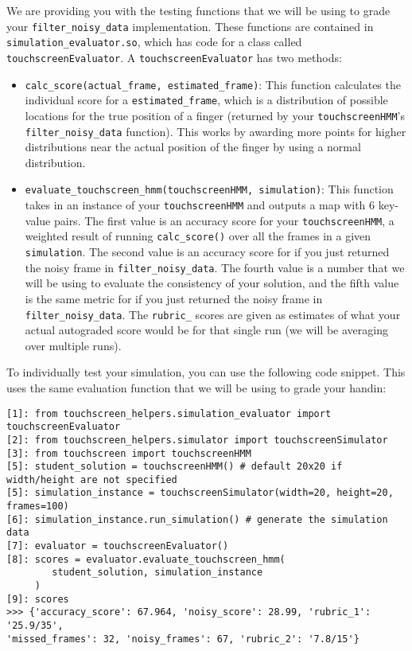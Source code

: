 \documentclass{article}
\begin{document}
    We are providing you with the testing functions that we will be using to grade your \texttt{filter\_noisy\_data} implementation. These functions are contained in \texttt{simulation\_evaluator.so}, which has code for a class called \texttt{touchscreenEvaluator}. A \texttt{touchscreenEvaluator} has two methods:
    \begin{itemize}
        \item \texttt{calc\_score(actual\_frame, estimated\_frame)}:
        This function calculates the individual score for a \texttt{estimated\_frame}, which is a distribution of possible locations for the true position of a finger (returned by your \texttt{touchscreenHMM}'s \texttt{filter\_noisy\_data} function). This works by awarding more points for higher distributions near the actual position of the finger by using a normal distribution.
        \item \texttt{evaluate\_touchscreen\_hmm(touchscreenHMM, simulation)}:
        This function takes in an instance of your \texttt{touchscreenHMM} and outputs a map with 6 key-value pairs. The first value is an accuracy score for your \texttt{touchscreenHMM}, a weighted result of running \texttt{calc\_score()} over all the frames in a given \texttt{simulation}. The second value is an accuracy score for if you just returned the noisy frame in \texttt{filter\_noisy\_data}. The fourth value is a number that we will be using to evaluate the consistency of your solution, and the fifth value is the same metric for if you just returned the noisy frame in \texttt{filter\_noisy\_data}. The \texttt{rubric\_} scores are given as estimates of what your actual autograded score would be for that single run (we will be averaging over multiple runs).
    \end{itemize}
    
    To individually test your simulation, you can use the following code snippet. This uses the same evaluation function that we will be using to grade your handin:
    \begin{verbatim}
[1]: from touchscreen_helpers.simulation_evaluator import touchscreenEvaluator
[2]: from touchscreen_helpers.simulator import touchscreenSimulator
[3]: from touchscreen import touchscreenHMM
[5]: student_solution = touchscreenHMM() # default 20x20 if width/height are not specified
[5]: simulation_instance = touchscreenSimulator(width=20, height=20, frames=100)
[6]: simulation_instance.run_simulation() # generate the simulation data
[7]: evaluator = touchscreenEvaluator()
[8]: scores = evaluator.evaluate_touchscreen_hmm(
        student_solution, simulation_instance
     )
[9]: scores
>>> {'accuracy_score': 67.964, 'noisy_score': 28.99, 'rubric_1': '25.9/35', 
'missed_frames': 32, 'noisy_frames': 67, 'rubric_2': '7.8/15'}
    \end{verbatim}
    
\end{document}
